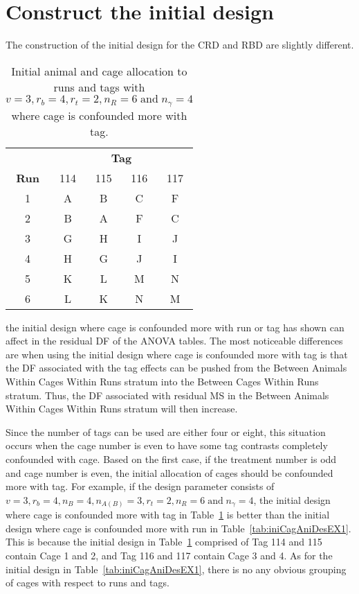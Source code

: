\documentclass[article]{jss}
\begin{document}
\section[Construct the initial design]{Construct the initial design}
The construction of the initial design for the CRD and RBD are slightly different. 



\begin{table}[ht]                                       
\centering                                              
\caption{Initial animal and cage allocation to runs and tags with $v = 3, r_b = 4, r_t = 2, n_R = 6 \; \mathrm{and} \; n_\gamma = 4$ where cage is confounded more with tag.}           
\begin{tabular}[t]{c|cccc}                                 
 & \multicolumn{4}{c}{{\bf Tag}} \\                     
{\bf Run}  & 114 & 115 & 116 & 117 \\                   
\hline                                                  
1  & A & B & C & F \\  
2  & B & A & F & C \\  
3  & G & H & I & J \\  
4  & H & G & J & I \\  
5  & K & L & M & N \\  
6  & L & K & N & M \\        
\end{tabular}                                           
\label{tab:iniCagAniDesEX2}                                  
\end{table}    


the initial design where cage is confounded more with run or tag has shown can affect in the residual DF of the ANOVA tables. The most noticeable differences are when using the initial design where cage is confounded more with tag is that the DF associated with the tag effects can be pushed from the Between Animals Within Cages Within Runs stratum into the Between Cages Within Runs stratum. Thus, the DF associated with residual MS in the Between Animals Within Cages Within Runs stratum will then increase. 

Since the number of tags can be used are either four or eight, this situation occurs when the cage number is even to have some tag contrasts completely confounded with cage. Based on the first case, if the treatment number is odd and cage number is even, the initial allocation of cages should be confounded more with tag. For example, if the design parameter consists of $v = 3, r_b = 4, n_B = 4, n_{A(B)} = 3, r_t = 2, n_R = 6 \; \mathrm{and} \; n_\gamma = 4$, the initial design where cage is confounded more with tag in Table~\ref{tab:iniCagAniDesEX2} is better than the initial design where cage is confounded more with run in Table~\ref{tab:iniCagAniDesEX1}. This is because the initial design in Table~\ref{tab:iniCagAniDesEX2} comprised of Tag 114 and 115 contain Cage 1 and 2, and Tag 116 and 117 contain Cage 3 and 4. As for the initial design in Table~\ref{tab:iniCagAniDesEX1}, there is no any obvious grouping of cages with respect to runs and tags. 
\end{document}
